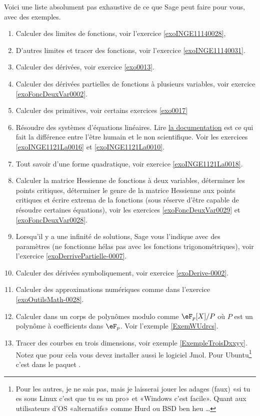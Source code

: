 Voici une liste absolument pas exhaustive de ce que Sage peut faire pour vous, avec des exemples. 
\begin{enumerate}

	\item
		Calculer des limites de fonctions, voir l'exercice \ref{exoINGE11140028},

	\item
		D'autres limites et tracer des fonctions, voir l'exercice \ref{exoINGE11140031}.
	\item
		Calculer des dérivées, voir exercice \ref{exo0013}.
	\item
		Calculer des dérivées partielles de fonctions à plusieurs variables, voir exercice \ref{exoFoncDeuxVar0002}.
	\item
		Calculer des primitives, voir certains exercices \ref{exo0017}
	\item

		Résoudre des systèmes d'équations linéaires. Lire \href{http://www.sagemath.org/doc/constructions/linear_algebra.html#solving-systems-of-linear-equations}{la documentation} est ce qui fait la différence entre l'être humain et le non scientifique. Voir les exercices  \ref{exoINGE1121La0016} et \ref{exoINGE1121La0010}.

	\item
		Tout savoir d'une forme quadratique, voir exercice \ref{exoINGE1121La0018}.
	\item
		Calculer la matrice Hessienne de fonctions à deux variables, déterminer les points critiques, déterminer le genre de la matrice Hessienne aux points critiques et écrire extrema de la fonctions (sous réserve d'être capable de résoudre certaines équations), voir les exercices \ref{exoFoncDeuxVar0029} et \ref{exoFoncDeuxVar0028}.
	\item
		Lorsqu'il y a une infinité de solutions, Sage vous l'indique avec des paramètres (ne fonctionne hélas pas avec les fonctions trigonométriques), voir l'exercice \ref{exoDerrivePartielle-0007}.


	\item
		Calculer des dérivées symboliquement, voir exercice \ref{exoDerive-0002}.
	\item
		Calculer des approximations numériques comme dans l'exercice \ref{exoOutilsMath-0028}.
    \item
        Calculer dans un corps de polynômes modulo comme \( \eF_p[X]/P\) où \( P\) est un polynôme à coefficients dans \( \eF_p\). Voir l'exemple \ref{ExemWUdrcs}.
	\item
        Tracer des courbes en trois dimensions, voir exemple \ref{ExempleTroisDxxyy}. Notez que pour cela vous devez installer aussi le logiciel Jmol. Pour Ubuntu\footnote{Pour les autres, je ne sais pas, mais je laisserai jouer les adages (faux) «si tu es sous Linux c'est que tu es un pro» et «Windows c'est facile». Quant aux utilisateurs d'OS «alternatifs» comme Hurd ou BSD ben heu \ldots} c'est dans le paquet .
\end{enumerate}

